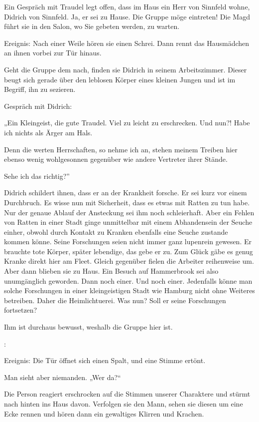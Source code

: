 Ein Gespräch mit Traudel legt offen, dass im Haus ein Herr von Sinnfeld wohne, Didrich von Sinnfeld. Ja, er sei zu Hause. Die Gruppe möge eintreten! Die Magd führt sie in den Salon, wo Sie gebeten werden, zu warten. 

Ereignis: Nach einer Weile hören sie einen Schrei. Dann rennt das Hausmädchen an ihnen vorbei zur Tür hinaus.

Geht die Gruppe dem nach, finden sie Didrich in seinem Arbeitszimmer. Dieser beugt sich gerade über den leblosen Körper eines kleinen Jungen und ist im Begriff, ihn zu sezieren.

Gespräch mit Didrich:

„Ein Kleingeist, die gute Traudel. Viel zu leicht zu erschrecken. Und nun?! Habe ich nichts als Ärger am Hals.

Denn die werten Herrschaften, so nehme ich an, stehen meinem Treiben hier ebenso wenig wohlgesonnen gegenüber wie andere Vertreter ihrer Stände.

Sehe ich das richtig?”

Didrich schildert ihnen, dass er an der Krankheit forsche. Er sei kurz vor einem Durchbruch. Es wisse nun mit Sicherheit, dass es etwas mit Ratten zu tun habe. Nur der genaue Ablauf der Ansteckung sei ihm noch schleierhaft. Aber ein Fehlen von Ratten in einer Stadt ginge unmittelbar mit einem Abhandensein der Seuche einher, obwohl durch Kontakt zu Kranken ebenfalls eine Seuche zustande kommen könne. Seine Forschungen seien nicht immer ganz lupenrein gewesen. Er brauchte tote Körper, später lebendige, das gebe er zu. Zum Glück gäbe es genug Kranke direkt hier am Fleet. Gleich gegenüber fielen die Arbeiter reihenweise um. Aber dann blieben sie zu Haus. Ein Besuch auf Hammerbrook sei also unumgänglich geworden. Dann noch einer. Und noch einer. Jedenfalls könne man solche Forschungen in einer kleingeistigen Stadt wie Hamburg nicht ohne Weiteres betreiben. Daher die Heimlichtuerei. Was nun? Soll er seine Forschungen fortsetzen?

Ihm ist durchaus bewusst, weshalb die Gruppe hier ist.





:

Ereignis: Die Tür öffnet sich einen Spalt, und eine Stimme ertönt.

Man sieht aber niemanden. „Wer da?“

Die Person reagiert erschrocken auf die Stimmen unserer Charaktere und stürmt nach hinten ins Haus davon. Verfolgen sie den Mann, sehen sie diesen um eine Ecke rennen und hören dann ein gewaltiges Klirren und Krachen.

